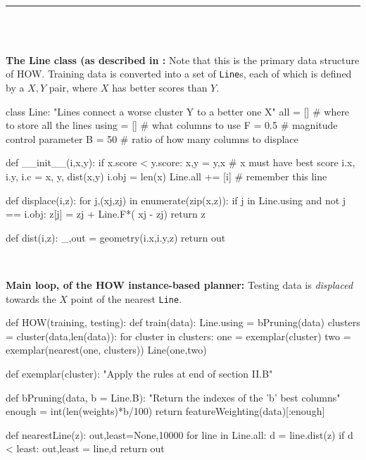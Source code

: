 

\begin{figure*} 
~\hrule~
\begin{minipage}{.45\linewidth}
\small

~\\

{\bf The Line class (as described in :}
Note that this is the primary data structure of HOW.
Training data is converted into a set of {\tt Line}s,
each of which is defined by a $X,Y$ pair, where $X$
has better scores than $Y$.
 
\begin{python}[left]
class Line:
  "Lines connect a worse cluster Y to a better one X"
  all   = []    # where to store all the lines
  using = []    # what columns to use
  F     = 0.5   # magnitude control parameter
  B     = 50    # ratio of how many columns to displace

 def __init__(i,x,y):
    if x.score < y.score:
      x,y = y,x      # x must have best score
    i.x, i.y, i.c = x, y, dist(x,y) 
    i.obj = len(x) 
    Line.all += [i]  # remember this line

  def displace(i,z):
    for j,(xj,zj) in enumerate(zip(x,z)):
      if j in Line.using and not j == i.obj:  
        z[j] = zj + Line.F*( xj - zj)
    return z

  def dist(i,z):
    _,out = geometry(i.x,i.y,z)
    return out
\end{python}

~~



{\bf Main loop, of the  HOW  instance-based planner:}
Testing data is {\em displaced}
towards   the $X$ point of the nearest {\tt Line}.
\begin{python}[left]
def HOW(training, testing):
  def train(data):
    Line.using = bPruning(data)
    clusters   = cluster(data,len(data)):
    for cluster in clusters:
      one = exemplar(cluster)
      two = exemplar(nearest(one, clusters))
      Line(one,two)
 
   def exemplar(cluster):
    "Apply the rules at end of section II.B"

     
   def bPruning(data,  b = Line.B):
    "Return the indexes of the 'b' best columns" 
    enough  = int(len(weights)*b/100)
    return featureWeighting(data)[:enough]

  def nearestLine(z):
    out,least=None,10000
    for line in Line.all:
      d = line.dist(z)
      if d < least: out,least = line,d
    return out
   

\end{python}
\end{minipage}
\end{figure*}
